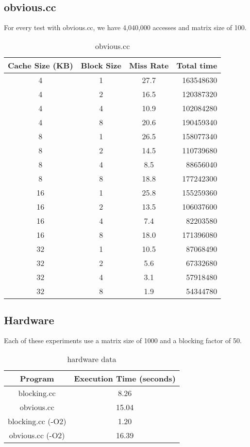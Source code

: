 \documentclass[letterpaper, 12pt, oneside]{memoir}
\begin{document}
\subsection{obvious.cc}
For every test with obvious.cc, we have 4,040,000 accesses and matrix size of
100.

\begin{table}[H]
\centering
\begin{tabular}{c|c|c|r}
    Cache Size (KB)  & Block Size & Miss Rate & Total time \\ \hline 
    4  & 1 & 27.7   & 163548630 \\
    4  & 2 & 16.5   & 120387320 \\
    4  & 4 & 10.9   & 102084280 \\
    4  & 8 & 20.6   & 190459340 \\ \hline
    8  & 1 & 26.5   & 158077340 \\
    8  & 2 & 14.5   & 110739680 \\
    8  & 4 & 8.5    & 88656040 \\
    8  & 8 & 18.8   & 177242300 \\ \hline
    16 & 1 & 25.8   & 155259360 \\
    16 & 2 & 13.5   & 106037600 \\
    16 & 4 & 7.4    & 82203580 \\
    16 & 8 & 18.0   & 171396080 \\ \hline
    32 & 1 & 10.5   & 87068490 \\
    32 & 2 & 5.6    & 67332680 \\
    32 & 4 & 3.1    & 57918480 \\
    32 & 8 & 1.9    & 54344780 \\
\end{tabular}
\caption{obvious.cc}
\end{table}

\subsection{Hardware}
Each of these experiments use a matrix size of 1000 and a blocking factor of 50.

\begin{table}[H]
\centering
\begin{tabular}{c|c}
    Program & Execution Time (seconds) \\ \hline
    blocking.cc        & 8.26 \\
    obvious.cc         & 15.04 \\
    blocking.cc (-O2)  & 1.20 \\
    obvious.cc  (-O2)  & 16.39
\end{tabular}
\caption{hardware data}
\end{table}
\end{document}
